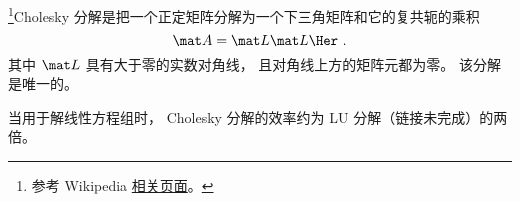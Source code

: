
\begin{issues}
\issueDraft
\end{issues}


\footnote{参考 Wikipedia \href{https://en.wikipedia.org/wiki/Cholesky_decomposition}{相关页面}。}Cholesky 分解是把一个正定矩阵分解为一个下三角矩阵和它的复共轭的乘积
\begin{equation}
\mat A = \mat L \mat L\Her~.
\end{equation}
其中 $\mat L$ 具有大于零的实数对角线， 且对角线上方的矩阵元都为零。 该分解是唯一的。

当用于解线性方程组时， Cholesky 分解的效率约为 LU 分解（链接未完成）的两倍。
